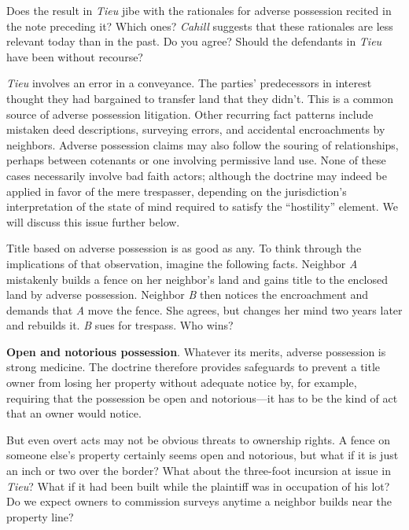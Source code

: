 
\item Does the result in \textit{Tieu} jibe with the rationales for adverse
possession recited in the note preceding it? Which ones?
\textit{Cahill} suggests that these rationales are less relevant today than in
the past. Do you agree? Should the defendants in \textit{Tieu} have been
without recourse?

\item \textit{Tieu} involves an error in a conveyance. The parties' predecessors
in interest thought they had bargained to transfer land that they didn't. This
is a common source of adverse possession litigation. Other recurring fact
patterns include mistaken deed descriptions, surveying errors, and accidental
encroachments by neighbors. Adverse possession claims may also follow the
souring of relationships, perhaps between cotenants or one involving permissive
land use. None of these cases necessarily involve bad faith actors; although
the doctrine may indeed be applied in favor of the mere trespasser, depending
on the jurisdiction's interpretation of the state of mind required to satisfy
the ``hostility'' element. We will discuss this issue further below.

\item Title based on adverse possession is as good as any. To think through the
implications of that observation, imagine the following facts. Neighbor \emph A
mistakenly builds a fence on her neighbor's land and gains title to the enclosed
land by adverse possession. Neighbor \emph B then notices the encroachment and
demands that \emph A move the fence. She agrees, but changes her mind two years
later and rebuilds it. \emph B sues for trespass. Who wins?

\item \textbf{Open and notorious possession}.
\label{n:mannillo-v-gorski}
Whatever its merits, adverse
possession is strong medicine. The doctrine therefore provides safeguards to
prevent a title owner from losing her property without adequate notice by, for
example, requiring that the possession be open and notorious---it has to be the
kind of act that an owner would notice. 

But even overt acts may not be obvious threats to ownership rights. A fence on
someone else's property certainly seems open and notorious, but what if it is
just an inch or two over the border? What about the three-foot incursion at
issue in \textit{Tieu}? What if it had been built while the plaintiff was in
occupation of his lot? Do we expect owners to commission surveys anytime a
neighbor builds near the property line?

